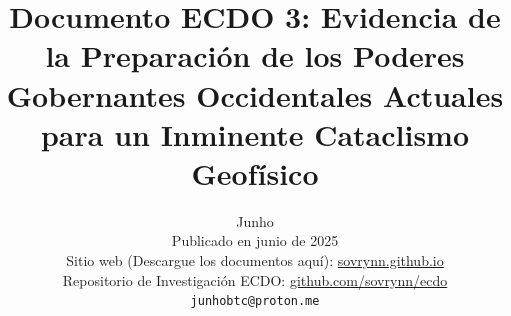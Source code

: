 \documentclass[10pt,twocolumn,letterpaper]{article}
\begin{document}
\title{Documento ECDO 3: Evidencia de la Preparación de los Poderes Gobernantes Occidentales Actuales para un Inminente Cataclismo Geofísico}

\author{Junho\\
Publicado en junio de 2025\\
Sitio web (Descargue los documentos aquí): \href{https://sovrynn.github.io}{sovrynn.github.io}\\
Repositorio de Investigación ECDO: \href{https://github.com/sovrynn/ecdo}{github.com/sovrynn/ecdo}\\
{\tt\small junhobtc@proton.me}
}

\maketitle
\end{document}
